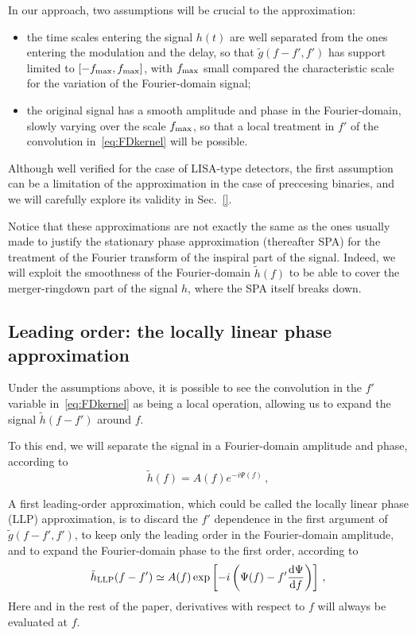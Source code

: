 \documentclass[aps,showpacs,%
prd,superscriptaddress,nofootinbib]{revtex4}
\newcommand{\be}{\begin{equation}}
\newcommand{\ee}{\end{equation}}
\newcommand\ud{{\mathrm{d}}}
\begin{document}
In our approach, two assumptions will be crucial to the approximation:
\begin{itemize}
	\item the time scales entering the signal $h(t)$ are well separated from the ones entering the modulation and the delay, so that $\tilde{g}(f-f',f')$ has support limited to $[-f_{\rm max},f_{\rm max}]$, with $f_{\rm max}$ small compared the characteristic scale for the variation of the Fourier-domain signal;
	\item the original signal has a smooth amplitude and phase in the Fourier-domain, slowly varying over the scale $f_{\rm max}$, so that a local treatment in $f'$ of the convolution in~\eqref{eq:FDkernel} will be possible.
\end{itemize}
Although well verified for the case of LISA-type detectors, the first assumption can be a limitation of the approximation in the case of preccesing binaries, and we will carefully explore its validity in Sec.~\ref{}.

Notice that these approximations are not exactly the same as the ones usually made to justify the stationary phase approximation (thereafter SPA) for the treatment of the Fourier transform of the inspiral part of the signal. Indeed, we will exploit the smoothness of the Fourier-domain $\tilde{h}(f)$ to be able to cover the merger-ringdown part of the signal $h$, where the SPA itself breaks down.


\subsection{Leading order: the locally linear phase approximation}
\label{subsec:LLP}

Under the assumptions above, it is possible to see the convolution in the $f'$ variable in~\eqref{eq:FDkernel} as being a local operation, allowing us to expand the signal $\tilde{h}(f-f')$ around $f$.

To this end, we will separate the signal in a Fourier-domain amplitude and phase, according to
%
\be
	\tilde{h}(f) = A(f) e^{-i\Psi(f)} \,,
\ee
%

A first leading-order approximation, which could be called the locally linear phase (LLP) approximation, is to discard the $f'$ dependence in the first argument of $\tilde{g}(f-f', f')$, to keep only the leading order in the Fourier-domain amplitude, and to expand the Fourier-domain phase to the first order, according to
%
\be
	\tilde{h}_{\rm LLP}(f-f') \simeq A(f) \exp\left[ -i\left( \Psi(f) - f' \frac{\ud \Psi}{\ud f} \right) \right] \,,
\ee
%
Here and in the rest of the paper, derivatives with respect to $f$ will always be evaluated at $f$.
\end{document}
